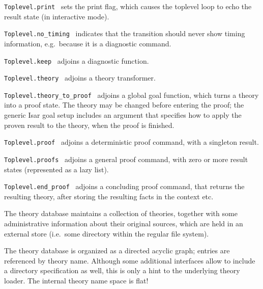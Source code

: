 \begin{isabellebody}
\begin{isamarkuptext}
  \begin{description}

  \item \verb|Toplevel.print|~ sets the print flag, which
  causes the toplevel loop to echo the result state (in interactive
  mode).

  \item \verb|Toplevel.no_timing|~ indicates that the
  transition should never show timing information, e.g.\ because it is
  a diagnostic command.

  \item \verb|Toplevel.keep|~ adjoins a diagnostic
  function.

  \item \verb|Toplevel.theory|~ adjoins a theory
  transformer.

  \item \verb|Toplevel.theory_to_proof|~ adjoins a global
  goal function, which turns a theory into a proof state.  The theory
  may be changed before entering the proof; the generic Isar goal
  setup includes an argument that specifies how to apply the proven
  result to the theory, when the proof is finished.

  \item \verb|Toplevel.proof|~ adjoins a deterministic
  proof command, with a singleton result.

  \item \verb|Toplevel.proofs|~ adjoins a general proof
  command, with zero or more result states (represented as a lazy
  list).

  \item \verb|Toplevel.end_proof|~ adjoins a concluding
  proof command, that returns the resulting theory, after storing the
  resulting facts in the context etc.

  \end{description}%
\end{isamarkuptext}%
\isamarkuptrue%
%
\endisatagmlref
{\isafoldmlref}%
%
\isadelimmlref
%
\endisadelimmlref
%
\isamarkuptrue%
%
\begin{isamarkuptext}%
The theory database maintains a collection of theories, together
  with some administrative information about their original sources,
  which are held in an external store (i.e.\ some directory within the
  regular file system).

  The theory database is organized as a directed acyclic graph;
  entries are referenced by theory name.  Although some additional
  interfaces allow to include a directory specification as well, this
  is only a hint to the underlying theory loader.  The internal theory
  name space is flat!


\end{isamarkuptext}
\end{isabellebody}
